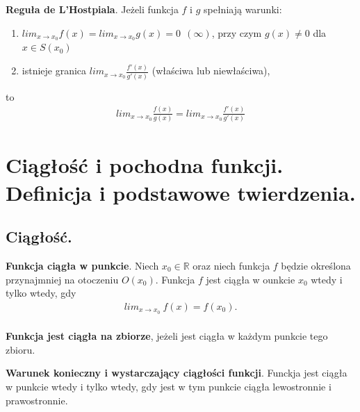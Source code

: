 \documentclass[12pt]{article}
\begin{document}
    \begin{theorem}
        \textbf{Reguła de L'Hostpiala}. Jeżeli funkcja $f$ i  $g$ spełniają warunki:
        \begin{enumerate}
            \item $lim_{x \rightarrow x_0} f(x) = lim_{x \rightarrow x_0} g(x) = 0 ~~ (\infty)$, przy czym $g(x) \neq 0$ dla $x \in S(x_0)$
            \item istnieje granica $lim_{x \rightarrow x_0} \frac{f'(x)}{g'(x)}$ (właściwa lub niewłaściwa),
        \end{enumerate}
        to
        \begin{align*}
            lim_{x \rightarrow x_0} \frac{f(x)}{g(x)} = lim_{x \rightarrow x_0} \frac{f'(x)}{g'(x)}
        \end{align*}
    \end{theorem}

    \newpage

    \section{Ciągłość i pochodna funkcji. Definicja i podstawowe twierdzenia.}

    \subsection{Ciągłość.}

    \begin{definition}
        \textbf{Funkcja ciągła w punkcie}. Niech $x_0 \in \mathbb{R}$ oraz niech funkcja $f$ będzie określona przynajmniej
        na otoczeniu $O(x_0)$. Funkcja $f$ jest ciągła w ounkcie $x_0$ wtedy i tylko wtedy, gdy
        \begin{align*}
            lim_{x \rightarrow x_0} ~ f(x) = f(x_0).
        \end{align*}
        \hfill \\

        \textbf{Funkcja jest ciągła na zbiorze}, jeżeli jest ciągła w każdym punkcie tego zbioru.
    \end{definition}

    \begin{theorem}
        \textbf{Warunek konieczny i wystarczający ciągłości funkcji}. Funckja jest ciągła w punkcie wtedy i tylko wtedy,
        gdy jest w tym punkcie ciągła lewostronnie i prawostronnie.
    \end{theorem}
\end{document}
